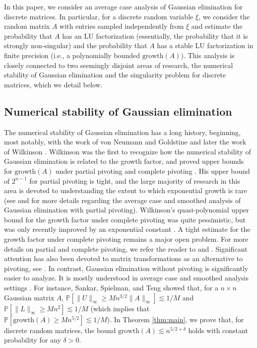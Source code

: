\documentclass[reqno]{amsart}
\numberwithin{equation}{section}
\begin{document}
In this paper, we consider an average case analysis of Gaussian elimination for discrete matrices. In particular, for a discrete random variable $\xi$, we consider the random matrix $A$ with entries sampled independently from $\xi$ and estimate the probability that $A$ has an LU factorization (essentially, the probability that it is strongly non-singular) and the probability that $A$ has a stable LU factorization in finite precision (i.e., a polynomially bounded $\mathrm{growth}(A)$). This analysis is closely connected to two seemingly disjoint areas of research, the numerical stability of Gaussian elimination and the singularity problem for discrete matrices, which we detail below.


\subsection{Numerical stability of Gaussian elimination} The numerical stability of Gaussian elimination has a long history, beginning, most notably, with the work of von Neumann and Goldstine \cite{von1947numerical} and later the work of Wilkinson \cite{wilkinson1961error,Wilkinson1965AEP}. Wilkinson was the first to recognize how the numerical stability of Gaussian elimination is related to the growth factor, and proved upper bounds for $\mathrm{growth}(A)$ under partial pivoting \cite[pg. 212]{Wilkinson1965AEP} and complete pivoting \cite{wilkinson1961error}. His upper bound of $2^{n-1}$ for partial pivoting is tight, and the large majority of research in this area is devoted to understanding the extent to which exponential growth is rare (see \cite{huang2024average,trefethen2012smart,trefethen1990average} and \cite[Lecture 22]{trefethen2022numerical} for more details regarding the average case and smoothed analysis of Gaussian elimination with partial pivoting). Wilkinson's quasi-polynomial upper bound for the growth factor under complete pivoting was quite pessimistic, but was only recently improved by an exponential constant \cite{bisain2023new}. A tight estimate for the growth factor under complete pivoting remains a major open problem. For more details on partial and complete pivoting, we refer the reader to \cite{urschel72numerical} and \cite[Section 1.1]{edelman2024some}. Significant attention has also been devoted to matrix transformations as an alternative to pivoting, see \cite{demmel2023improved,parker1995random,peca2023growth}.
In contrast, Gaussian elimination without pivoting is significantly easier to analyze. It is mostly understood in average case and smoothed analysis settings \cite{sankar2006smoothed,yeung1997probabilistic}. For instance, Sankar, Spielman, and Teng showed that, for a $n \times n$ Gaussian matrix $A$, $\mathbb{P}\left[\|U\|_\infty \ge M n^{3/2} \|A \|_{\infty} \right] \lesssim 1/M$ \cite[Theorem 4.3]{sankar2006smoothed} and $\mathbb{P}\left[\|L\|_\infty \ge M n^{2} \right] \lesssim 1/M$ \cite[Theorem 4.4]{sankar2006smoothed} (which implies that $\mathbb{P}[\mathrm{growth}(A) \ge  M n^{5/2}] \lesssim 1/M$). In Theorem \ref{thm:main}, we prove that, for discrete random matrices, the bound $\mathrm{growth}(A) \lesssim n^{5/2 + \delta}$ holds with constant probability for any $\delta >0$.
\end{document}
